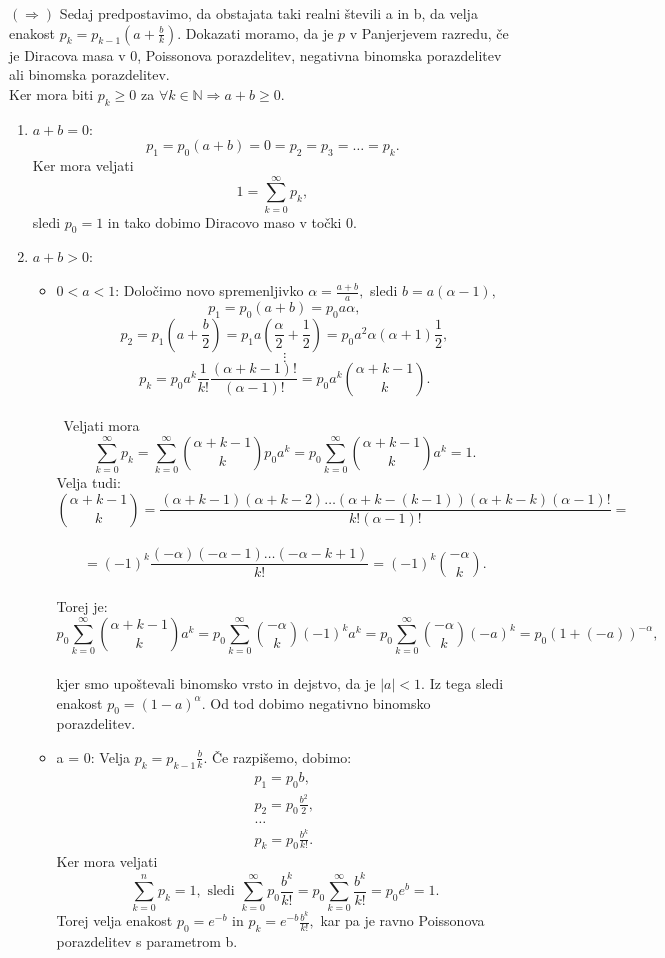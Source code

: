 \documentclass[a4paper]{article}
\begin{document}
\pagebreak
$(\Rightarrow)$ Sedaj predpostavimo, da obstajata taki realni števili a in b, da velja enakost $p_k = p_{k-1}(a + \frac{b}{k}).$ Dokazati moramo, da je $p$ v Panjerjevem razredu, če je Diracova masa v 0, Poissonova porazdelitev, negativna binomska porazdelitev ali binomska porazdelitev.
\\[1.5mm] Ker mora biti $p_k \geq 0$ za $\forall k \in \mathbb{N} \Rightarrow a+b \geq 0$.
\begin{enumerate}
	
	\item \textbf{$a+b=0$}:\\ $$p_1 = p_0(a+b)=0=p_2=p_3= \ldots =p_k.$$ Ker mora veljati $$1 = \sum_{k=0}^{\infty}p_k,$$sledi $p_0=1$ in tako dobimo Diracovo maso v točki 0.
	
	\item \textbf{$a+b>0$}: 
	\begin{itemize}
		\item $0<a<1$:  Določimo novo spremenljivko $\alpha=\frac{a+b}{a},$ sledi $ b=a(\alpha-1),$ \\ $$p_1=p_0(a+b)=p_0 a \alpha,$$  $$p_2=p_1(a+\frac{b}{2})=p_1a(\frac{\alpha}{2}+\frac{1}{2})=p_0a^2\alpha(\alpha + 1) \frac{1}{2},$$  $$\vdots$$  $$p_k=p_0a^k\frac{1}{k!}\frac{(\alpha+k-1)!}{(\alpha-1)!}=p_0 a^k \binom{\alpha+k-1}{k}.$$ \\\ {Veljati mora $$\sum_{k=0}^{\infty}p_k=\sum_{k=0}^{\infty}\binom{\alpha+k-1}{k}p_0a^k=p_0\sum_{k=0}^{\infty}\binom{\alpha+k-1}{k}a^k=1.$$ Velja tudi: \\ $$\binom{\alpha+k-1}{k}=\frac{(\alpha+k-1)(\alpha+k-2)\ldots(\alpha+k-(k-1))(\alpha+k-k)(\alpha-1)!}{k!(\alpha-1)!}=$$ \\ $$=(-1)^k\frac{(-\alpha)(-\alpha-1)\ldots(-\alpha-k+1)}{k!}=(-1)^k\binom{-\alpha}{k}.$$ \\ Torej je: \\ $$p_0\sum_{k=0}^{\infty}\binom{\alpha+k-1}{k}a^k=p_0\sum_{k=0}^{\infty}\binom{-\alpha}{k}(-1)^ka^k=p_0\sum_{k=0}^{\infty}\binom{-\alpha}{k}(-a)^k=p_0(1+(-a))^{-\alpha},$$ \\ kjer smo upoštevali binomsko vrsto in dejstvo, da je $|a|<1.$ Iz tega sledi enakost $p_0=(1-a)^{\alpha}.$ Od tod dobimo negativno binomsko porazdelitev.}

		\item a = 0: Velja $p_k = p_{k-1} \frac{b}{k}$. Če razpišemo, dobimo:
		$$ \begin{array}{c}
		p_1 = p_0 b, \\[1.5mm]
		p_2 = p_0 \frac{b^2}{2}, \\[1.5mm]
		\ldots \\[1.5mm]
		p_k = p_0 \frac{b^k}{k!}.
		\end{array} $$
		Ker mora veljati \\
$$
		\sum_{k=0}^{n} p_k = 1, \text{ sledi }  \sum_{k=0}^{\infty} p_0 \frac{b^k}{k!} = p_0 \sum_{k=0}^{\infty} \frac{b^k}{k!} = p_0 e^b = 1.$$ Torej velja enakost $p_0 = e^{-b} \text{ in } p_k = e^{-b} \frac{b^k}{k!},$ kar pa je ravno Poissonova porazdelitev s parametrom b.


\end{itemize}
\end{enumerate}
\end{document}

